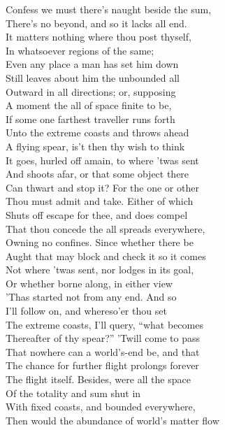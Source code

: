 Confess we must there's naught beside the sum,\\
There's no beyond, and so it lacks all end.\\
It matters nothing where thou post thyself,\\
In whatsoever regions of the same;\\
Even any place a man has set him down\\
Still leaves about him the unbounded all\\
Outward in all directions; or, supposing\\
A moment the all of space finite to be,\\
If some one farthest traveller runs forth\\
Unto the extreme coasts and throws ahead\\
A flying spear, is't then thy wish to think\\
It goes, hurled off amain, to where 'twas sent\\
And shoots afar, or that some object there\\
Can thwart and stop it? For the one or other\\
Thou must admit and take. Either of which\\
Shuts off escape for thee, and does compel\\
That thou concede the all spreads everywhere,\\
Owning no confines. Since whether there be\\
Aught that may block and check it so it comes\\
Not where 'twas sent, nor lodges in its goal,\\
Or whether borne along, in either view\\
'Thas started not from any end. And so\\
I'll follow on, and whereso'er thou set\\
The extreme coasts, I'll query, ``what becomes\\
Thereafter of thy spear?'' 'Twill come to pass\\
That nowhere can a world's-end be, and that\\
The chance for further flight prolongs forever\\
The flight itself. Besides, were all the space\\
Of the totality and sum shut in\\
With fixed coasts, and bounded everywhere,\\
Then would the abundance of world's matter flow\\
